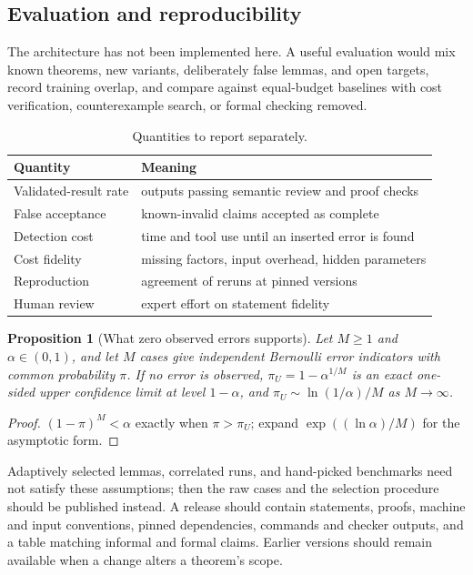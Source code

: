 \documentclass[11pt,reqno]{amsart}
\numberwithin{equation}{section}
\theoremstyle{plain}
\newtheorem{proposition}[theorem]{Proposition}
\theoremstyle{definition}
\theoremstyle{remark}
\begin{document}
\subsection{Evaluation and reproducibility}\label{sec:evaluation}
The architecture has not been implemented here. A useful evaluation would
mix known theorems, new variants, deliberately false lemmas, and open
targets, record training overlap, and compare against equal-budget baselines
with cost verification, counterexample search, or formal checking removed.

\begin{table}[htbp]
\caption{Quantities to report separately.}
\small
\begin{tabularx}{\textwidth}{@{}lY@{}}
\toprule
Quantity & Meaning\\
\midrule
Validated-result rate & outputs passing semantic review and proof checks\\
False acceptance & known-invalid claims accepted as complete\\
Detection cost & time and tool use until an inserted error is found\\
Cost fidelity & missing factors, input overhead, hidden parameters\\
Reproduction & agreement of reruns at pinned versions\\
Human review & expert effort on statement fidelity\\
\bottomrule
\end{tabularx}
\end{table}

\begin{proposition}[What zero observed errors supports]\label{prop:zero-errors}
Let $M\ge1$ and $\alpha\in(0,1)$, and let $M$ cases give independent
Bernoulli error indicators with common probability $\pi$. If no error is
observed, $\pi_U=1-\alpha^{1/M}$ is an exact one-sided upper confidence limit
at level $1-\alpha$, and $\pi_U\sim\ln(1/\alpha)/M$ as $M\to\infty$.
\end{proposition}
\begin{proof}
$(1-\pi)^M<\alpha$ exactly when $\pi>\pi_U$; expand
$\exp((\ln\alpha)/M)$ for the asymptotic form.
\end{proof}
Adaptively selected lemmas, correlated runs, and hand-picked benchmarks need
not satisfy these assumptions; then the raw cases and the selection procedure
should be published instead. A release should contain statements, proofs,
machine and input conventions, pinned dependencies, commands and checker
outputs, and a table matching informal and formal claims. Earlier versions
should remain available when a change alters a theorem's scope.
\end{document}
